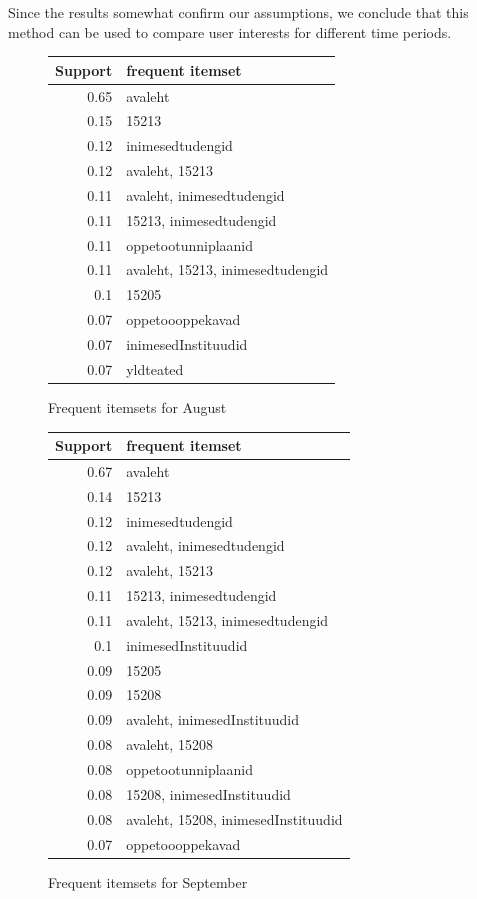 \documentclass[12pt, english,a4paper]{article}
\begin{document}
Since the results somewhat confirm our assumptions, we conclude that this method can be used to compare user interests for different time periods.


\begin{figure}[H]
  \centering
\begin{tabular}{ r | l }
Support & frequent itemset \\ \hline
0.65 & avaleht \\ \hline
0.15 & 15213 \\ \hline
0.12 & inimesedtudengid \\ \hline
0.12 & avaleht, 15213 \\ \hline
0.11 & avaleht, inimesedtudengid \\ \hline
0.11 & 15213, inimesedtudengid \\ \hline
0.11 & oppetootunniplaanid \\ \hline
0.11 & avaleht, 15213, inimesedtudengid \\ \hline
0.1 & 15205 \\ \hline
0.07 & oppetoooppekavad \\ \hline
0.07 & inimesedInstituudid \\ \hline
0.07 & yldteated \\ \hline
\end{tabular}
  \caption{Frequent itemsets for August }
  \label{aug2}
\end{figure}



\begin{figure}[H]
  \centering
\begin{tabular}{ r | l }
Support & frequent itemset \\ \hline
0.67 & avaleht \\ \hline
0.14 & 15213 \\ \hline
0.12 & inimesedtudengid \\ \hline
0.12 & avaleht, inimesedtudengid \\ \hline
0.12 & avaleht, 15213 \\ \hline
0.11 & 15213, inimesedtudengid \\ \hline
0.11 & avaleht, 15213, inimesedtudengid \\ \hline
0.1 & inimesedInstituudid \\ \hline
0.09 & 15205 \\ \hline
0.09 & 15208 \\ \hline
0.09 & avaleht, inimesedInstituudid \\ \hline
0.08 & avaleht, 15208 \\ \hline
0.08 & oppetootunniplaanid \\ \hline
0.08 & 15208, inimesedInstituudid \\ \hline
0.08 & avaleht, 15208, inimesedInstituudid \\ \hline
0.07 & oppetoooppekavad \\ \hline
\end{tabular}
  \caption{Frequent itemsets for September }
  \label{sep2}
\end{figure}
\end{document}
